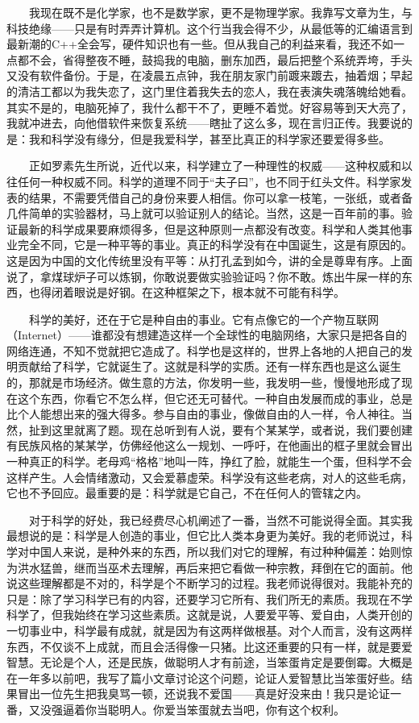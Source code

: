 　　我现在既不是化学家，也不是数学家，更不是物理学家。我靠写文章为生，与科技绝缘——只是有时弄弄计算机。这个行当我会得不少，从最低等的汇编语言到最新潮的C++全会写，硬件知识也有一些。但从我自己的利益来看，我还不如一点都不会，省得整夜不睡，鼓捣我的电脑，删东加西，最后把整个系统弄垮，手头又没有软件备份。于是，在凌晨五点钟，我在朋友家门前踱来踱去，抽着烟；早起的清洁工都以为我失恋了，这门里住着我失去的恋人，我在表演失魂落魄给她看。其实不是的，电脑死掉了，我什么都干不了，更睡不着觉。好容易等到天大亮了，我就冲进去，向他借软件来恢复系统——瞎扯了这么多，现在言归正传。我要说的是：我和科学没有缘分，但是我爱科学，甚至比真正的科学家还要爱得多些。

　　正如罗素先生所说，近代以来，科学建立了一种理性的权威——这种权威和以往任何一种权威不同。科学的道理不同于“夫子曰”，也不同于红头文件。科学家发表的结果，不需要凭借自己的身份来要人相信。你可以拿一枝笔，一张纸，或者备几件简单的实验器材，马上就可以验证别人的结论。当然，这是一百年前的事。验证最新的科学成果要麻烦得多，但是这种原则一点都没有改变。科学和人类其他事业完全不同，它是一种平等的事业。真正的科学没有在中国诞生，这是有原因的。这是因为中国的文化传统里没有平等：从打孔孟到如今，讲的全是尊卑有序。上面说了，拿煤球炉子可以炼钢，你敢说要做实验验证吗？你不敢。炼出牛屎一样的东西，也得闭着眼说是好钢。在这种框架之下，根本就不可能有科学。

　　科学的美好，还在于它是种自由的事业。它有点像它的一个产物互联网（Internet）——谁都没有想建造这样一个全球性的电脑网络，大家只是把各自的网络连通，不知不觉就把它造成了。科学也是这样的，世界上各地的人把自己的发明贡献给了科学，它就诞生了。这就是科学的实质。还有一样东西也是这么诞生的，那就是市场经济。做生意的方法，你发明一些，我发明一些，慢慢地形成了现在这个东西，你看它不怎么样，但它还无可替代。一种自由发展而成的事业，总是比个人能想出来的强大得多。参与自由的事业，像做自由的人一样，令人神往。当然，扯到这里就离了题。现在总听到有人说，要有个某某学，或者说，我们要创建有民族风格的某某学，仿佛经他这么一规划、一呼吁，在他画出的框子里就会冒出一种真正的科学。老母鸡“格格”地叫一阵，挣红了脸，就能生一个蛋，但科学不会这样产生。人会情绪激动，又会爱慕虚荣。科学没有这些老病，对人的这些毛病，它也不予回应。最重要的是：科学就是它自己，不在任何人的管辖之内。

　　对于科学的好处，我已经费尽心机阐述了一番，当然不可能说得全面。其实我最想说的是：科学是人创造的事业，但它比人类本身更为美好。我的老师说过，科学对中国人来说，是种外来的东西，所以我们对它的理解，有过种种偏差：始则惊为洪水猛兽，继而当巫术去理解，再后来把它看做一种宗教，拜倒在它的面前。他说这些理解都是不对的，科学是个不断学习的过程。我老师说得很对。我能补充的只是：除了学习科学已有的内容，还要学习它所有、我们所无的素质。我现在不学科学了，但我始终在学习这些素质。这就是说，人要爱平等、爱自由，人类开创的一切事业中，科学最有成就，就是因为有这两样做根基。对个人而言，没有这两样东西，不仅谈不上成就，而且会活得像一只猪。比这还重要的只有一样，就是要爱智慧。无论是个人，还是民族，做聪明人才有前途，当笨蛋肯定是要倒霉。大概是在一年多以前吧，我写了篇小文章讨论这个问题，论证人爱智慧比当笨蛋好些。结果冒出一位先生把我臭骂一顿，还说我不爱国——真是好没来由！我只是论证一番，又没强逼着你当聪明人。你爱当笨蛋就去当吧，你有这个权利。

